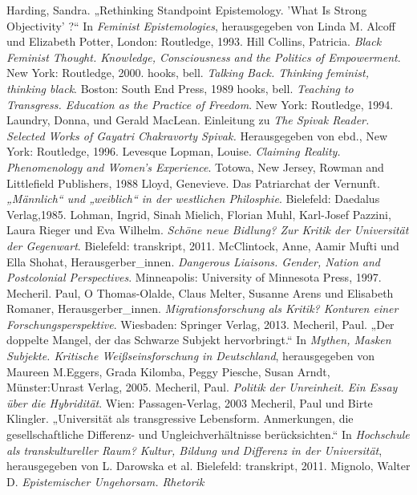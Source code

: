 \begin{thebibliography}{100}
 Harding, Sandra. „Rethinking Standpoint Epistemology. 'What
Is Strong Objectivity' ?“ In \emph{Feminist Epistemologies}, herausgegeben von Linda M. Alcoff und Elizabeth Potter,  London: Routledge, 1993.
 Hill Collins, Patricia. \emph{Black Feminist Thought.
Knowledge, Consciousness and the Politics of Empowerment}. New York: Routledge, 2000.
 hooks, bell. \emph{Talking Back. Thinking feminist, thinking black}. Boston: South End Press, 1989
 hooks, bell. \emph{Teaching to Transgress. Education as the Practice of Freedom}. New York: Routledge, 1994.
 Laundry, Donna, und Gerald MacLean. Einleitung zu \emph{The Spivak Reader. Selected Works of
Gayatri Chakravorty Spivak.} Herausgegeben von ebd., New York: Routledge, 1996.
 Levesque Lopman, Louise. \emph{Claiming Reality. Phenomenology and
Women's Experience}. Totowa, New Jersey, Rowman and Littlefield Publishers, 1988
 Lloyd, Genevieve. Das Patriarchat der Vernunft. \emph{„Männlich“ und „weiblich“ in der westlichen
Philosphie}. Bielefeld: Daedalus Verlag,1985. 
 Lohman, Ingrid,  Sinah Mielich, Florian Muhl, Karl-Josef Pazzini, Laura Rieger und Eva Wilhelm. 
\emph{Schöne neue Bidlung? Zur Kritik der Universität der Gegenwart}. Bielefeld: transkript, 2011.
 McClintock, Anne, Aamir Mufti und Ella Shohat,
Herausgerber\_innen. \emph{Dangerous Liaisons.
Gender, Nation and Postcolonial Perspectives}. Minneapolis: University of Minnesota Press, 1997.
 Mecheril. Paul, O Thomas-Olalde, Claus Melter, Susanne Arens und Elisabeth Romaner,
Herausgerber\_innen. \emph{Migrationsforschung als Kritik? Konturen einer
Forschungsperspektive}. Wiesbaden: Springer Verlag, 2013.
 Mecheril, Paul. „Der doppelte Mangel, der das Schwarze Subjekt hervorbringt.“ In \textit{Mythen, Masken Subjekte. Kritische Weißseinsforschung in Deutschland}, herausgegeben von Maureen M.Eggers, Grada Kilomba, Peggy Piesche, Susan Arndt, Münster:Unrast Verlag, 2005.
 Mecheril, Paul. \emph{Politik der Unreinheit. Ein Essay über die Hybridität}. Wien: Passagen-Verlag, 2003
 Mecheril, Paul und  Birte Klingler. „Universität als
transgressive Lebensform. Anmerkungen, die gesellschaftliche Differenz- und
Ungleichverhältnisse berücksichten.“ In \emph{Hochschule als transkultureller
Raum? Kultur, Bildung und Differenz in der Universität}, herausgegeben von L. Darowska et al. Bielefeld: transkript, 2011. 
 Mignolo, Walter D. \emph{Epistemischer Ungehorsam. Rhetorik
}
\end{thebibliography}
